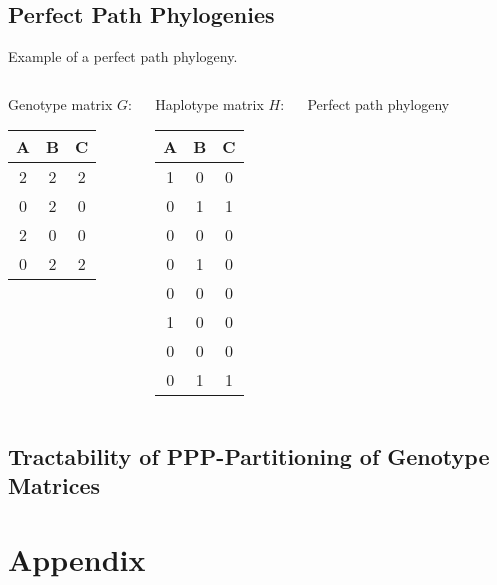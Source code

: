 \documentclass{beamer}
\begin{document}
\subsection{Perfect Path Phylogenies}



\begin{frame}{Example of a perfect path phylogeny.}
  \begin{columns}[t]
    \begin{exampleblock}{Genotype matrix}
      $G\colon$
      \begin{tabular}{ccc}
        A & B & C \\\hline
        2 & 2 & 2 \\
        0 & 2 & 0 \\
        2 & 0 & 0 \\
        0 & 2 & 2 
      \end{tabular}
    \end{exampleblock}

    \begin{exampleblock}{Haplotype matrix}
      $H\colon$
      \begin{tabular}{ccc}
        A & B & C \\\hline
        1 & 0 & 0 \\
        0 & 1 & 1 \\
        0 & 0 & 0 \\
        0 & 1 & 0 \\
        0 & 0 & 0 \\
        1 & 0 & 0 \\
        0 & 0 & 0 \\
        0 & 1 & 1 
      \end{tabular}
    \end{exampleblock}

    \begin{exampleblock}{Perfect path phylogeny}
      \begin{center}
      \end{center}
    \end{exampleblock}
  \end{columns}
\end{frame}



\subsection{Tractability of PPP-Partitioning of Genotype Matrices}


\appendix

\section*{Appendix}
\end{document}
